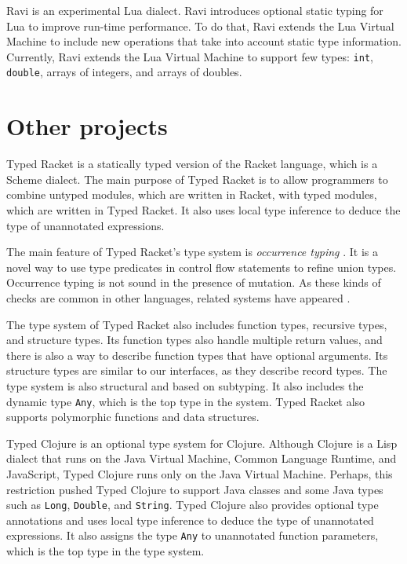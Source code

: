 Ravi \citep{ravi} is an experimental Lua dialect.
Ravi introduces optional static typing for Lua to improve run-time performance.
To do that, Ravi extends the Lua Virtual Machine to include new
operations that take into account static type information.
Currently, Ravi extends the Lua Virtual Machine to support few types:
\texttt{int}, \texttt{double}, arrays of integers, and arrays of doubles.

\section{Other projects}

Typed Racket \citep{tobin-hochstadt2008ts} is a statically typed version
of the Racket language, which is a Scheme dialect.
The main purpose of Typed Racket is to allow programmers to combine
untyped modules, which are written in Racket, with typed modules, which are
written in Typed Racket.
It also uses local type inference to deduce the type of unannotated expressions.

The main feature of Typed Racket's type system is \emph{occurrence typing}
\citep{tobin-hochstadt2010ltu}.
It is a novel way to use type predicates in control flow statements
to refine union types.
Occurrence typing is not sound in the presence of mutation.
As these kinds of checks are common in other languages, related systems
have appeared \citep{guha2011tlc,winther2011gtp,pearce2013ccf}. 

The type system of Typed Racket also includes function types, recursive
types, and structure types.
Its function types also handle multiple return values, and there is
also a way to describe function types that have optional arguments.
Its structure types are similar to our interfaces, as they describe record types.
The type system is also structural and based on subtyping.
It also includes the dynamic type \texttt{Any}, which is the top type in the system.
Typed Racket also supports polymorphic functions and data structures.

Typed Clojure \citep{bonnaire-sergeant2012typed-clojure} is an
optional type system for Clojure.
Although Clojure is a Lisp dialect that runs on the Java Virtual Machine,
Common Language Runtime, and JavaScript, Typed Clojure runs only on
the Java Virtual Machine.
Perhaps, this restriction pushed Typed Clojure to support Java classes
and some Java types such as \texttt{Long}, \texttt{Double}, and \texttt{String}.
Typed Clojure also provides optional type annotations and uses
local type inference to deduce the type of unannotated expressions.
It also assigns the type \texttt{Any} to unannotated function parameters,
which is the top type in the type system.

